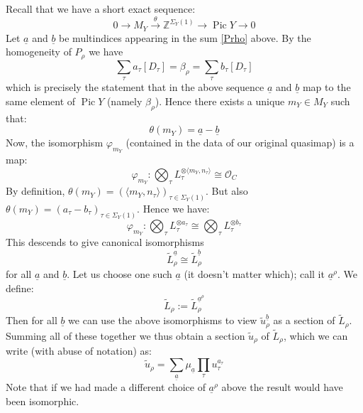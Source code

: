 \documentclass[11pt]{amsart}
\newcommand{\Z}{\mathbb{Z}}
\newcommand{\OO}{\mathcal{O}}
\newcommand{\Pic}{\operatorname{Pic}}
\theoremstyle{definition}
\theoremstyle{definition}
\begin{document}
Recall that we have a short exact sequence:
\begin{equation} \label{Pic short exact sequence for Y} 0 \longrightarrow M_Y \overset{\theta}{\longrightarrow} \Z^{\Sigma_Y(1)} \longrightarrow \Pic Y \longrightarrow 0 \end{equation}
Let $\underline{a}$ and $\underline{b}$ be multindices appearing in the sum \eqref{Prho} above. By the homogeneity of $P_\rho$ we have
\begin{equation*} \sum_\tau a_\tau [D_\tau] = \beta_\rho = \sum_\tau b_\tau [D_\tau] \end{equation*}
which is precisely the statement that in the above sequence $\underline{a}$ and $\underline{b}$ map to the same element of $\Pic Y$ (namely $\beta_\rho$). Hence there exists a unique $m_Y \in M_Y$ such that:
\begin{equation*} \theta(m_Y) = \underline{a} - \underline{b} \end{equation*}
Now, the isomorphism $\varphi_{m_Y}$ (contained in the data of our original quasimap) is a map:
\begin{equation*} \varphi_{m_Y} : \bigotimes_\tau L_\tau^{\otimes \langle m_Y, n_\tau \rangle} \cong \OO_{C} \end{equation*}
By definition, $\theta(m_Y) = (\langle m_Y,n_\tau \rangle)_{\tau \in \Sigma_Y(1)}$. But also $\theta(m_Y) = (a_\tau - b_\tau)_{\tau \in \Sigma_Y(1)}$. Hence we have:
\begin{equation*} \varphi_{m_Y} : \bigotimes_\tau L_\tau^{\otimes a_\tau} \cong \bigotimes_\tau L_\tau^{\otimes b_\tau} \end{equation*}
This descends to give canonical isomorphisms
\begin{equation*} \tilde{L}_\rho^{\underline{a}} \cong \tilde{L}_\rho^{\underline{b}} \end{equation*}
for all $\underline{a}$ and $\underline{b}$. Let us choose one such $\underline{a}$ (it doesn't matter which); call it $\underline{a}^\rho$. We define:
\begin{equation*} \tilde{L}_\rho := \tilde{L}_\rho^{\underline{a}^\rho} \end{equation*}
Then for all $\underline{b}$ we can use the above isomorphisms to view $\tilde{u}_\rho^{\underline{b}}$ as a section of $\tilde{L}_\rho$. Summing all of these together we thus obtain a section $\tilde{u}_\rho$ of $\tilde{L}_\rho$, which we can write (with abuse of notation) as:
\begin{equation*} \tilde{u}_\rho = \sum_{\underline{a}} \mu_{\underline{a}} \prod_\tau u_\tau^{a_\tau} \end{equation*}
Note that if we had made a different choice of $\underline{a}^\rho$ above the result would have been isomorphic.
\end{document}
